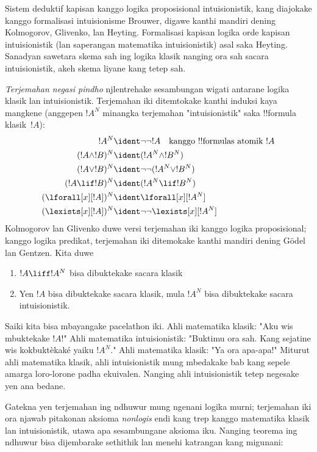 \documentclass[../../../include/open-logic-section]{subfiles}
\begin{document}
Sistem deduktif kapisan
kanggo logika proposisional
intuisionistik, kang diajokake
kanggo formalisasi intuisionisme
Brouwer, digawe kanthi mandiri
dening Kolmogorov, Glivenko,
lan Heyting. Formalisasi
kapisan logika orde kapisan
intuisionistik (lan saperangan
matematika intuisionistik)
asal saka Heyting. Sanadyan
sawetara skema sah ing logika
klasik nanging ora sah sacara
intuisionistik, akeh skema
liyane kang tetep sah.

\emph{Terjemahan negasi pindho}
njlentrehake sesambungan
wigati antarane logika klasik
lan intuisionistik.
Terjemahan iki ditemtokake
kanthi induksi kaya mangkene
(anggepen $!A^N$ minangka
terjemahan "intuisionistik"
saka !!{formula} klasik~$!A$):
\begin{align*}
!A^N & \ident \lnot\lnot !A \quad \text{kanggo !!{formula}s atomik $!A$} \\
(!A \land !B)^N & \ident (!A^N \land !B^N) \\
(!A \lor !B)^N & \ident  \lnot\lnot (!A^N \lor !B^N) \\
(!A \lif !B)^N & \ident (!A^N \lif !B^N) \\
(\lforall[x][!A])^N & \ident \lforall[x][!A^N] \\
(\lexists[x][!A])^N & \ident \lnot\lnot\lexists[x][!A^N]
\end{align*}
Kolmogorov lan Glivenko
duwe versi terjemahan iki
kanggo logika proposisional;
kanggo logika predikat,
terjemahan iki ditemokake
kanthi mandiri dening
G\"odel lan Gentzen.
Kita duwe

\begin{thm}
\begin{enumerate}
\item $!A \liff !A^N$ bisa dibuktekake sacara klasik
\item Yen $!A$ bisa dibuktekake sacara klasik,
  mula $!A^N$ bisa dibuktekake sacara intuisionistik.
\end{enumerate}
\end{thm}

Saiki kita bisa mbayangake
pacelathon iki. Ahli matematika
klasik: "Aku wis mbuktekake
$!A$!" Ahli matematika
intuisionistik: "Buktimu
ora sah. Kang sejatine
wis kokbuktèkaké yaiku
$!A^N$." Ahli matematika
klasik: "Ya ora apa-apa!"
Miturut ahli matematika
klasik, ahli intuisionistik
mung mbedakake bab kang
sepele amarga loro-lorone
padha ekuivalen. Nanging
ahli intuisionistik
tetep negesake yen ana
bedane.

Gatekna yen terjemahan
ing ndhuwur mung ngenani
logika murni; terjemahan
iki ora njawab pitakonan
aksioma \emph{nonlogis}
endi kang trep kanggo
matematika klasik lan
intuisionistik, utawa
apa sesambungane aksioma
iku. Nanging teorema
ing ndhuwur bisa
dijembarake sethithik
lan menehi katrangan
kang migunani:
\end{document}
